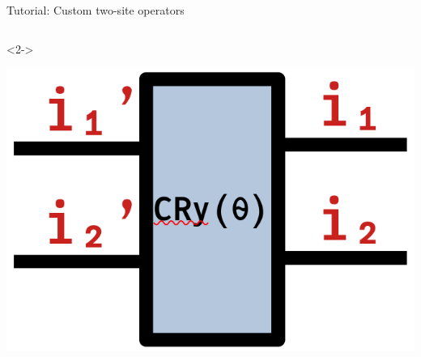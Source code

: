 \begin{frame}[fragile]{Tutorial: Custom two-site operators}
\begin{columns}
\begin{column}{5cm}
\begin{onlyenv}<2->
\vspace*{0.0cm}
\begin{center}
\includegraphics[width=1.0\textwidth]{
  slides/assets/CRy12.png
}
\end{center}
\vspace*{0.0cm}
\end{onlyenv}

\end{column}

\end{columns}

\end{frame}
